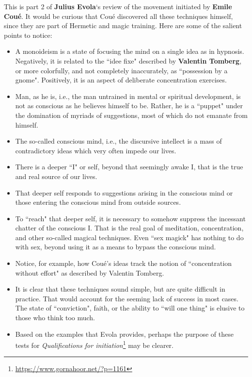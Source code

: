 \hfill

\begin{quotationx}
This is part 2 of \textbf{Julius Evola}`s review of the movement initiated by \textbf{Emile Coué}. It would be curious that Coué discovered all these techniques himself, since they are part of Hermetic and magic training. Here are some of the salient points to notice:

\begin{itemize}
\item A monoideism is a state of focusing the mind on a single idea as in hypnosis. Negatively, it is related to the ``idee fixe" described by \textbf{Valentin Tomberg}, or more colorfully, and not completely inaccurately, as ``possession by a gnome". Positively, it is an aspect of deliberate concentration exercises. 
\item Man, as he is, i.e., the man untrained in mental or spiritual development, is not as conscious as he believes himself to be. Rather, he is a ``puppet" under the domination of myriads of suggestions, most of which do not emanate from himself. 
\item The so-called conscious mind, i.e., the discursive intellect is a mass of contradictory ideas which very often impede our lives. 
\item There is a deeper ``I" or self, beyond that seemingly awake I, that is the true and real source of our lives. 
\item That deeper self responds to suggestions arising in the conscious mind or those entering the conscious mind from outside sources. 
\item To ``reach" that deeper self, it is necessary to somehow suppress the incessant chatter of the conscious I. That is the real goal of meditation, concentration, and other so-called magical techniques. Even ``sex magick" has nothing to do with sex, beyond using it as a means to bypass the conscious mind. 
\item Notice, for example, how Coué's ideas track the notion of ``concentration without effort" as described by Valentin Tomberg. 
\item It is clear that these techniques sound simple, but are quite difficult in practice. That would account for the seeming lack of success in most cases. The state of ``conviction", faith, or the ability to ``will one thing" is elusive to those who think too much. 
\item Based on the examples that Evola provides, perhaps the purpose of these tests for \textit{Qualifications for initiation}\footnote{\url{https://www.gornahoor.net/?p=1161}} may be clearer. 
\end{itemize}
\end{quotationx}

